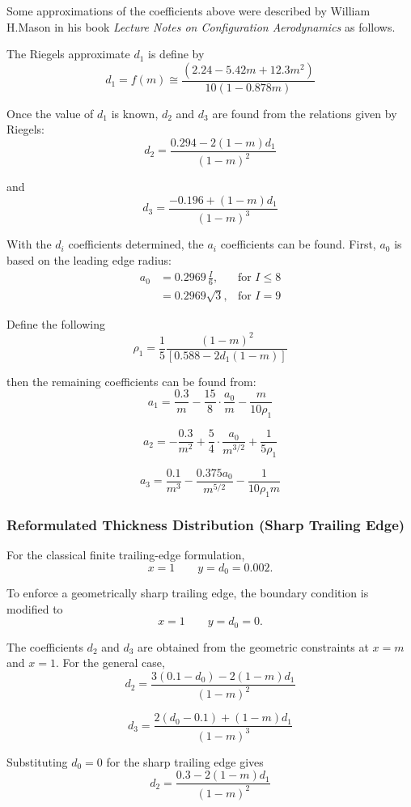 Some approximations of the coefficients above were described by William H.Mason in his book \textit{Lecture Notes on Configuration Aerodynamics} \cite{configuration_aerodynamics} as follows.

The Riegels approximate $d_1$ is define by
\[
d_1=f(m) \cong \frac{(2.24-5.42m+12.3m^2)}{10(1-0.878m)}
\]

Once the value of $d_1$ is known, $d_2$ and $d_3$ are found from the relations given by Riegels:
\[
d_2=\frac{0.294-2(1-m)d_1}{(1-m)^2}
\]

and 
\[
d_3=\frac{-0.196+(1-m)d_1}{(1-m)^3}
\]

With the $d_i$ coefficients determined, the $a_i$ coefficients can be found. First, $a_0$ is based on the leading edge radius:
\[
\begin{aligned}
a_0 &=0.2969 \, \frac{I}{6}, & \text{for }I\leq8\\
& =0.2969\sqrt{3} ,  & \text{for }I=9
\end{aligned}
\]

Define the following
\[
\rho_1=\frac{1}{5}\frac{(1-m)^2}{[0.588-2d_1(1-m)]}
\]

then the remaining coefficients can be found from:
\[
a_1=
\frac{0.3}{m}
-\frac{15}{8}\cdot\frac{a_0}{m}
-\frac{m}{10\rho_1}
\]

\[
a_2=
-\frac{0.3}{m^2}
+\frac{5}{4}\cdot\frac{a_0}{m^{3/2}}
+\frac{1}{5\rho_1}
\]

\[
a_3=
\frac{0.1}{m^3}
-\frac{0.375a_0}{m^{5/2}}
-\frac{1}{10\rho_1m}
\]


\subsubsection*{Reformulated Thickness Distribution (Sharp Trailing Edge)}

For the classical finite trailing-edge formulation,
\[
x=1 \qquad y=d_0=0.002 .
\]

To enforce a geometrically sharp trailing edge, the boundary condition is modified to
\[
x=1 \qquad y=d_0=0 .
\]

The coefficients $d_2$ and $d_3$ are obtained from the geometric constraints
at $x=m$ and $x=1$.
For the general case,
\[
d_2=\frac{3(0.1-d_0)-2(1-m)d_1}{(1-m)^2}
\]

\[
d_3=\frac{2(d_0-0.1)+(1-m)d_1}{(1-m)^3}
\]

Substituting $d_0=0$ for the sharp trailing edge gives
\[
d_2=\frac{0.3-2(1-m)d_1}{(1-m)^2}
\]

